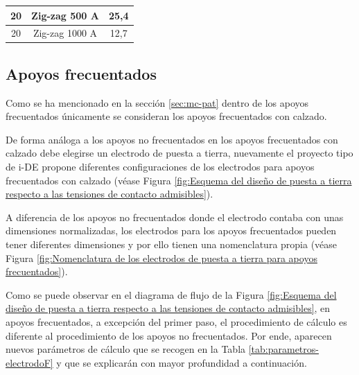 \begin{table}[H]
\begin{tabular}{|c|c|c|}
20                                                                                   & Zig-zag 500 A                                                               & 25,4                                                                                 \\ \hline
20                                                                                   & Zig-zag 1000 A                                                              & 12,7                                                                                 \\ \hline
\end{tabular}
\end{table}

\subsection{Apoyos frecuentados}
\label{subsec:pat-apoyosF}
Como se ha mencionado en la sección \ref{sec:mc-pat}  dentro de los apoyos frecuentados únicamente se consideran los apoyos frecuentados con calzado.

De forma análoga a los apoyos no frecuentados en los apoyos frecuentados con calzado debe elegirse un electrodo de puesta a tierra, nuevamente el proyecto tipo de \ac{i-DE} propone diferentes configuraciones de los electrodos para apoyos frecuentados con calzado (véase Figura \ref{fig:Esquema del diseño de puesta a tierra respecto a las tensiones de contacto admisibles}).


A diferencia de los apoyos no frecuentados donde el electrodo contaba con unas dimensiones normalizadas, los electrodos para los apoyos frecuentados pueden tener diferentes dimensiones y por ello tienen una nomenclatura propia (véase Figura \ref{fig:Nomenclatura de los electrodos de puesta a tierra para apoyos frecuentados}).


Como se puede observar en el diagrama de flujo de la Figura \ref{fig:Esquema del diseño de puesta a tierra respecto a las tensiones de contacto admisibles}, en apoyos frecuentados, a excepción del primer paso, el procedimiento de cálculo es diferente al procedimiento de los apoyos no frecuentados. Por ende, aparecen nuevos parámetros de cálculo que se recogen en la Tabla \ref{tab:parametros-electrodoF} y que se explicarán con mayor profundidad a continuación.

